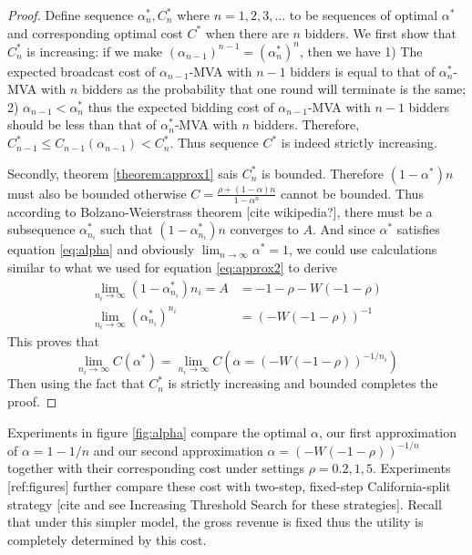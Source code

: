 \begin{proof}
Define sequence $\alpha^*_n, C^*_n$ where $n = 1, 2, 3, \ldots$ to be sequences of
optimal $\alpha^*$ and corresponding optimal cost $C^*$ when there are $n$
bidders. We first show that $C^*_n$ is increasing: if we make
$(\alpha_{n-1})^{n-1} = (\alpha^*_n)^n$, then we have 1) The expected broadcast
cost of $\alpha_{n-1}$-MVA with $n-1$ bidders is equal to that of
$\alpha^*_n$-MVA with $n$ bidders as the probability that one round will
terminate is the same; 2) $\alpha_{n-1} < \alpha^*_n$ thus the expected bidding
cost of $\alpha_{n-1}$-MVA with $n-1$ bidders should be less than that of
$\alpha^*_n$-MVA with $n$ bidders. Therefore, $C^*_{n-1} \leq C_{n-1}(\alpha_{n-1}) < C^*_n$.
Thus sequence $C^*$ is indeed strictly increasing.

Secondly, theorem \ref{theorem:approx1} sais $C^*_n$ is bounded. Therefore
$(1-\alpha^*)n$ must also be bounded otherwise $C = \frac{\rho+(1-\alpha)n}{1-\alpha^n}$ cannot be bounded.
Thus according to Bolzano-Weierstrass theorem [cite wikipedia?], there must be
a subsequence $\alpha^*_{n_i}$ such that $(1-\alpha^*_{n_i})n$ converges to $A$.
And since $\alpha^*$ satisfies equation \ref{eq:alpha} and obviously $\lim_{n \rightarrow \infty} \alpha^* = 1$, 
we could use calculations similar to what we used for equation \ref{eq:approx2} to derive
\begin{align*}
\lim_{n_i \rightarrow \infty} (1-\alpha^*_{n_i})n_i = A &= -1-\rho-W(-1-\rho)\\
\lim_{n_i \rightarrow \infty} (\alpha^*_{n_i})^{n_i} &= (-W(-1-\rho))^{-1}
\end{align*}
This proves that
$$\lim_{n_i \rightarrow \infty} C(\alpha^*) = \lim_{n_i \rightarrow \infty} C(\alpha = (-W(-1-\rho))^{-1/n_i})$$
Then using the fact that $C^*_n$ is strictly increasing and bounded completes the proof.
\end{proof}

Experiments in figure \ref{fig:alpha} compare the optimal $\alpha$, our first approximation
of $\alpha = 1-1/n$ and our second approximation $\alpha = (-W(-1-\rho))^{-1/n}$
together with their corresponding cost under settings $\rho = 0.2, 1, 5$.
Experiments [ref:figures] further compare these cost with two-step, fixed-step
California-split strategy [cite and see Increasing Threshold Search for these
strategies].  Recall that under this simpler model, the gross revenue is fixed
thus the utility is completely determined by this cost.

